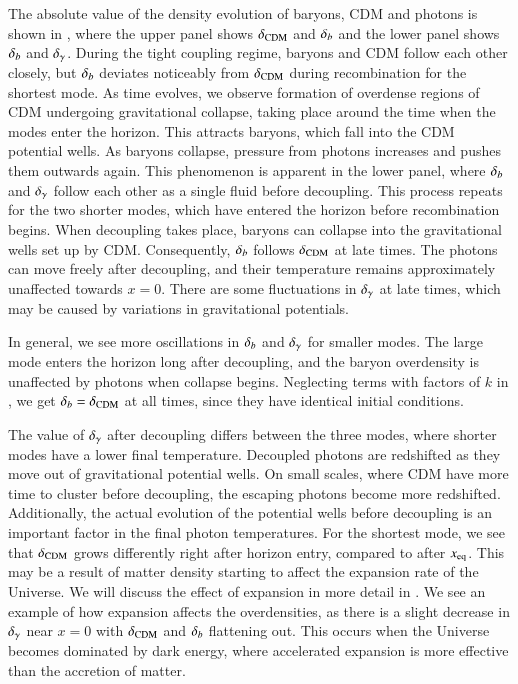 The absolute value of the density evolution of baryons, CDM and photons is shown in , where the upper panel shows $\delta_\mathrm{CDM}$ and $\delta_b$ and the lower panel shows $\delta_b$ and $\delta_\gamma$. During the tight coupling regime, baryons and CDM follow each other closely, but $\delta_b$ deviates noticeably from $\delta_\mathrm{CDM}$ during recombination for the shortest mode. As time evolves, we observe formation of overdense regions of CDM undergoing gravitational collapse, taking place around the time when the modes enter the horizon. This attracts baryons, which fall into the CDM potential wells. As baryons collapse, pressure from photons increases and pushes them outwards again. This phenomenon is apparent in the lower panel, where $\delta_b$ and $\delta_\gamma$ follow each other as a single fluid before decoupling. This process repeats for the two shorter modes, which have entered the horizon before recombination begins. When decoupling takes place, baryons can collapse into the gravitational wells set up by CDM. Consequently, $\delta_b$ follows $\delta_\mathrm{CDM}$ at late times. The photons can move freely after decoupling, and their temperature remains approximately unaffected towards $x=0$. There are some fluctuations in $\delta_\gamma$ at late times, which may be caused by variations in gravitational potentials.  

In general, we see more oscillations in $\delta_b$ and $\delta_\gamma$ for smaller modes. The large mode enters the horizon long after decoupling, and the baryon overdensity is unaffected by photons when collapse begins. Neglecting terms with factors of $k$ in , we get $\delta_b=\delta_\mathrm{CDM}$ at all times, since they have identical initial conditions. 

The value of $\delta_\gamma$ after decoupling differs between the three modes, where shorter modes have a lower final temperature. Decoupled photons are redshifted as they move out of gravitational potential wells. On small scales, where CDM have more time to cluster before decoupling, the escaping photons become more redshifted. Additionally, the actual evolution of the potential wells before decoupling is an important factor in the final photon temperatures. For the shortest mode, we see that $\delta_\mathrm{CDM}$ grows differently right after horizon entry, compared to after $x_\mathrm{eq}$. This may be a result of matter density starting to affect the expansion rate of the Universe. We will discuss the effect of expansion in more detail in . We see an example of how expansion affects the overdensities, as there is a slight decrease in $\delta_\gamma$ near $x=0$ with $\delta_\mathrm{CDM}$ and $\delta_b$ flattening out. This occurs when the Universe becomes dominated by dark energy, where accelerated expansion is more effective than the accretion of matter. 

